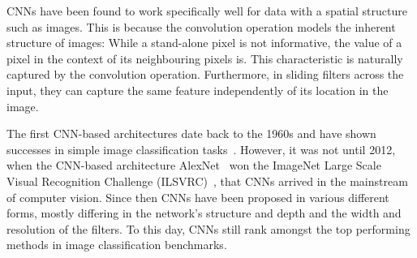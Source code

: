 \documentclass[a4paper]{article}
\begin{document}
CNNs have been found to work specifically well for data with a spatial structure
such as images. This is because the convolution operation models the inherent
structure of images: While a stand-alone pixel is not informative, the value of
a pixel in the context of its neighbouring pixels is. This characteristic is
naturally captured by the convolution operation. Furthermore, in sliding filters
across the input, they can capture the same feature independently of its
location in the image.

The first CNN-based architectures date back to the 1960s and have shown
successes in simple image classification tasks~\cite{lenet}. However, it was not
until 2012, when the CNN-based architecture AlexNet~\cite{alexnet} won the
ImageNet Large Scale Visual Recognition Challenge (ILSVRC)~\cite{imagenet}, that
CNNs arrived in the mainstream of computer vision. Since then CNNs have been
proposed in various different forms, mostly differing in the network's structure
and depth and the width and resolution of the filters. To this day, CNNs still
rank amongst the top performing methods in image classification benchmarks.
\end{document}
